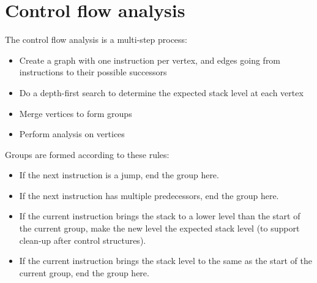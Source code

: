 \section{Control flow analysis}

The control flow analysis is a multi-step process:

\begin{itemize}
\item Create a graph with one instruction per vertex, and edges going from instructions to their possible successors
\item Do a depth-first search to determine the expected stack level at each vertex
\item Merge vertices to form groups
\item Perform analysis on vertices
\end{itemize}

Groups are formed according to these rules:
\begin{itemize}
\item If the next instruction is a jump, end the group here.
\item If the next instruction has multiple predecessors, end the group here.
\item If the current instruction brings the stack to a lower level than the start of the current group, make the new level the expected stack level (to support clean-up after control structures).
\item If the current instruction brings the stack level to the same as the start of the current group, end the group here.
\end{itemize}

